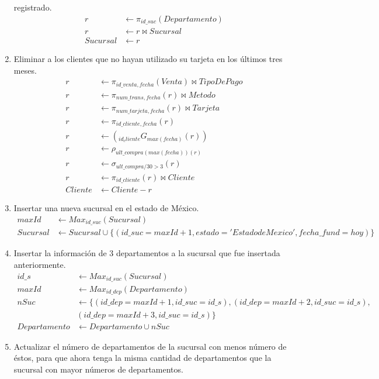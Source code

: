 \documentclass{article}
\begin{document}
\begin{enumerate}
{            registrado.
            \begin{align*}
                r &\leftarrow \pi_{id\_suc}(Departamento)\\
                r &\leftarrow r \bowtie Sucursal \\
                Sucursal &\leftarrow r
            \end{align*}
        }
        \item {
            Eliminar a los clientes que no hayan utilizado su tarjeta en los
            últimos tres meses.
            \begin{align*}
                r &\leftarrow \pi_{id\_venta, fecha}(Venta) \bowtie TipoDePago \\
                r &\leftarrow \pi_{num\_trans, fecha}(r) \bowtie Metodo \\
                r &\leftarrow \pi_{num\_tarjeta, fecha}(r) \bowtie Tarjeta \\
                r &\leftarrow \pi_{id\_cliente, fecha}(r) \\
                r &\leftarrow (_{id_cliente}G_{max(fecha)}(r)) \\
                r &\leftarrow \rho_{ult\_compra(max(fecha))(r)} \\
                r &\leftarrow \sigma_{ult\_compra/30 > 3}(r) \\
                r &\leftarrow \pi_{id\_cliente}(r) \bowtie Cliente \\
                Cliente &\leftarrow Cliente - r
            \end{align*}
        }
        \item {
            Insertar una nueva sucursal en el estado de México.
            \begin{align*}
                maxId &\leftarrow Max_{id\_suc}(Sucursal)\\
                Sucursal &\leftarrow Sucursal 
                \cup \{(id\_suc = maxId+1, estado='Estado de Mexico', 
                fecha\_fund = hoy)\}
            \end{align*}
        }
        \item {
            Insertar la información de 3 departamentos a la sucursal que fue
            insertada anteriormente.
            \begin{align*}
                id\_s &\leftarrow Max_{id\_suc}(Sucursal)\\
                maxId &\leftarrow Max_{id\_dep}(Departamento)\\
                nSuc &\leftarrow \{(id\_dep = maxId+1, id\_suc=id\_s),
                (id\_dep = maxId+2, id\_suc=id\_s),\\
                &(id\_dep = maxId+3, id\_suc=id\_s)\}\\
                Departamento &\leftarrow Departamento \cup nSuc
            \end{align*}
        }
        \item {
            Actualizar el número de departamentos de la sucursal con menos
            número de éstos, para que ahora tenga la misma cantidad de departamentos
            que la sucursal con mayor números de departamentos.
        }
    \end{enumerate}
\end{document}
